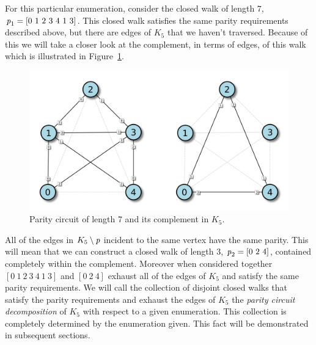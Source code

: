 For this particular enumeration, consider the closed walk of length $7$, $\operatorname{\mathit{p}}_1 = \left[0\ 1\ 2\ 3\ 4\ 1\ 3 \right]$. This closed walk satisfies the same parity requirements described above, but there are edges of $K_5$ that we haven't traversed.  Because of this we will take a closer look at the complement, in terms of edges, of this walk which is illustrated in Figure~\ref{fig:7cycle_comp}.   

\begin{figure}[h!]
  \centering
  \begin{minipage}{.50\textwidth}
  \includegraphics[height=.20\textheight]{pics/7cycle-K5-37-example} 
  \caption{Parity circuit of length 7 and its complement in $K_5$.\label{fig:7cycle_comp}}
  \end{minipage}
\end{figure}

All of the edges in $K_5 \setminus \operatorname{\mathit{p}}$ incident to the same vertex have the same parity. This will mean that we can construct a closed walk of length $3$, $\operatorname{\mathit{p}}_2 = \left[0\ 2\ 4 \right]$, contained completely within the complement. Moreover when considered together $\left[ 0\ 1\ 2\ 3\ 4\ 1\ 3 \right]$ and $\left[0\ 2\ 4 \right]$ exhaust all of the edges of $K_5$ and satisfy the same parity requirements. We will call the collection of disjoint closed walks that satisfy the parity requirements and exhaust the edges of $K_5$ the {\em parity circuit decomposition} of $K_5$ with respect to a given enumeration. This collection is completely determined by the enumeration given. This fact will be demonstrated in subsequent sections.



